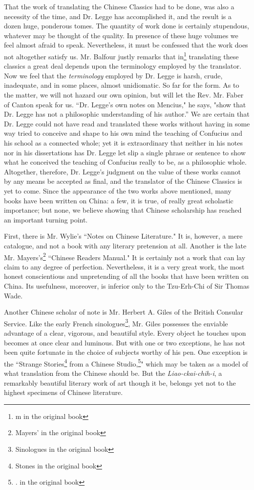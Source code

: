 That the work of translating the Chinese Classics had to be done, was also a necessity of the time, and Dr. Legge has accomplished it, and the result is a dozen huge, ponderous tomes.
The quantity of work done is certainly stupendous, whatever may be thought of the quality.
In presence of these huge volumes we feel almost afraid to speak.
Nevertheless, it must be confessed that the work does not altogether satisfy us.
Mr. Balfour justly remarks that in\footnote{m in the original book} translating these classics a great deal depends upon the terminology employed by the translator.
Now we feel that the \emph{terminology} employed by Dr. Legge is harsh, crude, inadequate, and in some places, almost unidiomatic.
So far for the form.
As to the matter, we will not hazard our own opinion, but will let the Rev. Mr. Faber of Canton speak for us.
``Dr. Legge's own notes on Mencius," he says, "show that Dr. Legge has not a philosophic understanding of his author.''
We are certain that Dr. Legge could not have read and translated these works without having in some way tried to conceive and shape to his own mind the teaching of Confucius and his school as a connected whole; yet it is extraordinary that neither in his notes nor in his dissertations has Dr. Legge let slip a single phrase or sentence to show what he conceived the teaching of Confucius really to be, as a philosophic whole.
Altogether, therefore, Dr. Legge's judgment on the value of these works cannot by any means  be accepted as final, and the translator of the Chinese Classics is yet to come.
Since the appearance of the two works above mentioned, many books have been written on China: a few, it is true, of really great scholastic importance; but none, we believe showing that Chinese scholarship has reached an important turning point.

First, there is Mr. Wylie's ``Notes on Chinese Literature."
It is, however, a mere catalogue, and not a book with any literary pretension at all.
Another is the late Mr. Mayers's\footnote{Mayers' in the original book} ``Chinese Readers Manual."
It is certainly not a work that can lay claim to any degree of perfection.
Nevertheless, it is a very great work, the most honest conscientious and unpretending of all the books that have been written on China.
Its usefulness, moreover, is inferior only to the Tzu-Erh-Chi of Sir Thomas Wade.

Another Chinese scholar of note is Mr. Herbert A. Giles of the British Consular Service.
Like the early French sinologues\footnote{Sinologues in the original book}, Mr. Giles possesses the enviable advantage of a clear, vigorous, and beautiful style.
Every object he touches upon becomes at once clear and luminous.
But with one or two exceptions, he has not  been quite fortunate in the choice of subjects worthy of his pen.
One exception is the ``Strange Stories\footnote{Stones in the original book} from a Chinese Studio,\footnote{. in the original book}" which may be taken as a model of what translation from the Chinese should be.
But the \emph{Liao-ckai-chih-i}, a remarkably beautiful literary work of art though it be, belongs yet not to the highest specimens of Chinese literature.

